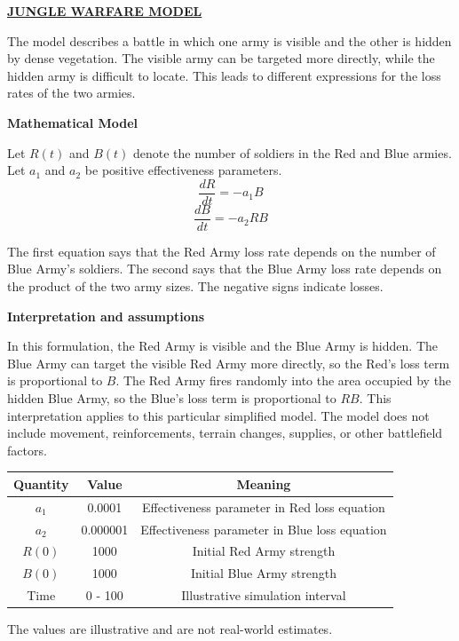 \documentclass{article}
\begin{document}
\vspace{2em}
\begin{center}
    \textbf{\underline{JUNGLE WARFARE MODEL}}
\end{center}

\noindent
The model describes a battle in which one army is visible and the other is hidden by dense vegetation. The visible army can be targeted more directly, while the hidden army is difficult to locate. This leads to different expressions for the loss rates of the two armies.

\vspace{1.5em}
\noindent
\textbf{Mathematical Model}

\noindent
Let $R(t)$ and $B(t)$ denote the number of soldiers in the Red and Blue armies. Let $a_1$ and $a_2$ be positive effectiveness parameters.
\[\frac{dR}{dt} = - a_1 B\]
\[\frac{dB}{dt} = - a_2 RB\]

\noindent
The first equation says that the Red Army loss rate depends on the number of Blue Army's soldiers. The second says that the Blue Army loss rate depends on the product of the two army sizes. The negative signs indicate losses.

\vspace{1.5em}
\noindent
\textbf{Interpretation and assumptions}

\noindent
In this formulation, the Red Army is visible and the Blue Army is hidden. The Blue Army can target the visible Red Army more directly, so the Red's loss term is proportional to $B$. The Red Army fires randomly into the area occupied by the hidden Blue Army, so the Blue's loss term is proportional to $RB$. This interpretation applies to this particular simplified model.
\noindent
The model does not include movement, reinforcements, terrain changes, supplies, or other battlefield factors.

\vspace{2em}
\begin{table}[h]
    \centering
    \begin{tabular}{|c|c|c|}
         \hline
    \textbf{Quantity} & \textbf{Value} &  \textbf{Meaning}\\
    \hline
    $a_1$ & 0.0001 & Effectiveness parameter in Red loss equation \\
    \hline
    $a_2$ & 0.000001 & Effectiveness parameter in Blue loss equation \\
    \hline
    $R(0)$ & 1000 & Initial Red Army strength \\
    \hline
    $B(0)$ & 1000 & Initial Blue Army strength \\
    \hline
    Time & 0 - 100 & Illustrative simulation interval \\
    \hline 
    \end{tabular}
\end{table}
The values are illustrative and are not real-world estimates.
\end{document}

